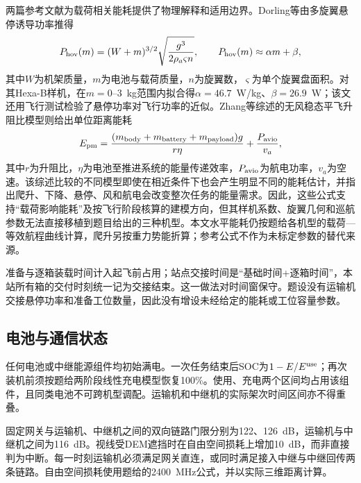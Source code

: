 两篇参考文献为载荷相关能耗提供了物理解释和适用边界。Dorling等由多旋翼悬停诱导功率推得
\begin{equation}
P_{\rm hov}(m)=(W+m)^{3/2}\sqrt{\frac{g^3}{2\rho_a\varsigma n}},\qquad
P_{\rm hov}(m)\approx \alpha m+\beta,
\label{eq:dorling}
\end{equation}
其中$W$为机架质量，$m$为电池与载荷质量，$n$为旋翼数，$\varsigma$为单个旋翼盘面积。对其Hexa-B样机，在$m=0$--$3$~kg范围内拟合得$\alpha=46.7$~W/kg、$\beta=26.9$~W；该文还用飞行测试检验了悬停功率对飞行功率的近似。Zhang等综述的无风稳态平飞升阻比模型则给出单位距离能耗
\begin{equation}
E_{\rm pm}=\frac{(m_{\rm body}+m_{\rm battery}+m_{\rm payload})g}{r\eta}
 +\frac{P_{\rm avio}}{v_a},
\label{eq:epm_literature}
\end{equation}
其中$r$为升阻比，$\eta$为电池至推进系统的能量传递效率，$P_{\rm avio}$为航电功率，$v_a$为空速。该综述比较的不同模型即使在相近条件下也会产生明显不同的能耗估计，并指出爬升、下降、悬停、风和航电会改变整次任务的能量需求\cite{dorling,zhang}。因此，这些公式支持“载荷影响能耗”及按飞行阶段核算的建模方向，但其样机系数、旋翼几何和巡航参数无法直接移植到题目给出的三种机型。本文水平能耗仍按题给各机型的载荷—等效航程曲线计算，爬升另按重力势能折算；参考公式不作为未标定参数的替代来源。

准备与逐箱装载时间计入起飞前占用；站点交接时间是“基础时间+逐箱时间”，本站所有箱的交付时刻统一记为交接结束。这一做法对时间窗保守。题设没有运输机交接悬停功率和准备工位数量，因此没有增设未经给定的能耗或工位容量参数。

\subsection{电池与通信状态}

任何电池或中继能源组件均初始满电。一次任务结束后SOC为$1-E/E^{\rm use}$；再次装机前须按题给两阶段线性充电模型恢复100\%。使用、充电两个区间均占用该组件，且同类电池不可跨机型调配。运输机和中继机的实际架次时间区间亦不得重叠。

固定网关与运输机、中继机之间的双向链路门限分别为122、126~dB，运输机与中继机之间为116~dB。视线受DEM遮挡时在自由空间损耗上增加10~dB，而非直接判为中断。每一时刻运输机必须满足网关直连，或同时满足接入中继与中继回传两条链路。自由空间损耗使用题给的2400~MHz公式，并以实际三维距离计算\cite{itur}。
